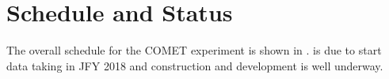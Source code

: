 \newcommand{\Component}[6]{
\def\tempshort{#2}
\ifx\tempshort\empty\def\printshort{}\else\def\printshort{(#2)}\fi
\def\tempmag{#3}
\def\tempconstr{#4}
\def\printmag{Magnet names: \emph{#3}}
\def\printconstr{Constructed by: \emph{#4}}
\def\printpars{{\small #6}}
\ifx\tempmag\empty%
	\def\lineone{\printconstr. }%
	\def\linetwo{}%
\else%
	\def\lineone{\printmag}%
	\def\linetwo{. \printconstr}%
\fi%
\subsubsection*{#1 \printshort}\vspace{-3ex}%
\lineone \linetwo\\
#5
\def\tempparams{#2}
\ifx\tempparams\empty\else
\begin{multicols}{2}
\begin{itemize}
	\setlength\itemsep{-1em}
#6
\end{itemize}
\end{multicols}
\vspace{-5ex}
\fi
}


\section{Schedule and Status}
\FigSchedule
The overall schedule for the COMET experiment is shown in .
\phaseI is due to start data taking in \ac{JFY} 2018 and construction and development is well underway.

